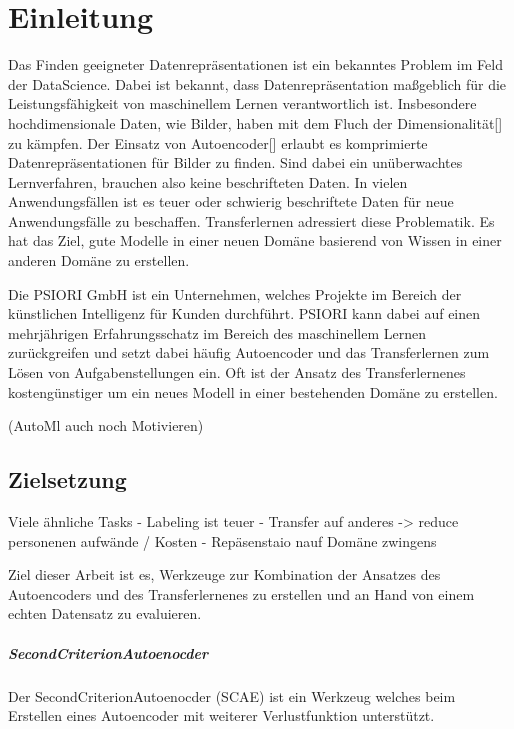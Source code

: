 \listoftodos

\chapter{Einleitung}
\label{chap:Einleitung}
	Das Finden geeigneter Datenrepräsentationen ist ein bekanntes Problem im Feld der DataScience. Dabei ist bekannt, dass Datenrepräsentation maßgeblich für die Leistungsfähigkeit von maschinellem Lernen verantwortlich ist. Insbesondere hochdimensionale Daten, wie Bilder, haben mit dem Fluch der Dimensionalität[] zu kämpfen. Der Einsatz von Autoencoder[] erlaubt es komprimierte Datenrepräsentationen für Bilder zu finden. Sind dabei ein unüberwachtes Lernverfahren, brauchen also keine beschrifteten Daten.
	In vielen Anwendungsfällen ist es teuer oder schwierig beschriftete Daten für neue Anwendungsfälle zu beschaffen. Transferlernen adressiert diese Problematik. Es hat das Ziel, gute Modelle in einer neuen Domäne basierend von Wissen in einer anderen Domäne zu erstellen.
	
	Die PSIORI GmbH \cite{PSIORIGmbH.2020} ist ein Unternehmen, welches Projekte im Bereich der künstlichen Intelligenz für Kunden durchführt. PSIORI kann dabei auf einen mehrjährigen Erfahrungsschatz im Bereich des maschinellem Lernen zurückgreifen und setzt dabei häufig Autoencoder und das Transferlernen zum Lösen von Aufgabenstellungen ein. Oft ist der Ansatz des Transferlernenes kostengünstiger um ein neues Modell in einer bestehenden Domäne zu erstellen. 

 	(AutoMl auch noch Motivieren)

	\section{Zielsetzung}
	\label{sec:Zielsetzung}
	
	Viele ähnliche Tasks
		- Labeling ist teuer
		- Transfer auf anderes -> reduce personenen aufwände / Kosten
		- Repäsenstaio nauf Domäne zwingens
		
	
	Ziel dieser Arbeit ist es, Werkzeuge zur Kombination der Ansatzes des Autoencoders und des Transferlernenes zu erstellen und an Hand von einem echten Datensatz zu evaluieren.
	\paragraph{SecondCriterionAutoenocder} Der SecondCriterionAutoenocder (SCAE) ist ein Werkzeug welches beim Erstellen eines Autoencoder mit weiterer Verlustfunktion unterstützt.  
